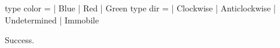 \chklistingtrue
{}
\begin{ChkListingMsg}
type color   =  | Blue  | Red  | Green
type dir   =  | Clockwise  | Anticlockwise  | Undetermined  | Immobile
\end{ChkListingMsg}
\begin{ChkListingErr}
Success.
\end{ChkListingErr}
